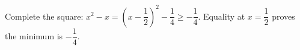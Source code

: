 Complete the square: $ x^2-x=(x-\dfrac{1}{2})^2-\dfrac{1}{4}\ge-\dfrac{1}{4}$. Equality at $ x=\dfrac{1}{2}$ proves the minimum is $\boxed{-\dfrac{1}{4}}$.
